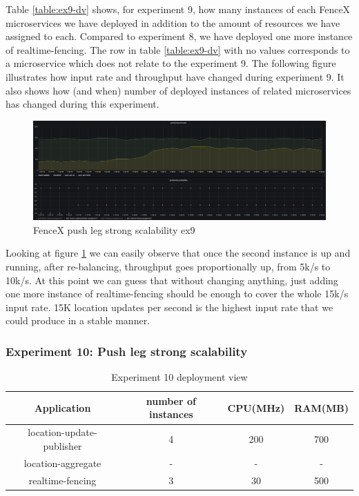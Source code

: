 \documentclass[a4]{report}
\begin{document}
    Table \ref{table:ex9-dv} shows, for experiment 9, how many instances of each FenceX microservices we have
    deployed in addition to the amount of resources we have assigned to each.
    Compared to experiment 8, we have deployed one more instance of realtime-fencing.
    The row in table \ref{table:ex9-dv} with no values corresponds to a microservice which does not relate to the
    experiment 9.
    The following figure illustrates how input rate and throughput have changed during experiment 9.
    It also shows how (and when) number of deployed instances of related microservices has changed during this
    experiment.

    \begin{figure}
        \caption{FenceX push leg strong scalability ex9}
        \label{fig:ex9}
        \includegraphics[scale=0.5]{images/evaluation/ex9-benchmarking-ongoing-2per4sec.png}
    \end{figure}

    \clearpage

    Looking at figure \ref{fig:ex9} we can easily observe that once the second instance is up and running, after
    re-balancing, throughput goes proportionally up, from 5k/s to 10k/s.
    At this point we can guess that without changing anything, just adding one more instance of realtime-fencing
    should be enough to cover the whole 15k/s input rate.
    15K location updates per second is the highest input rate that we could produce in a stable manner.

    \subsubsection{Experiment 10: Push leg strong scalability}
    \begin{table}[h!]
        \centering
        \begin{tabular}{|c|c|c|c|}
            \hline
            Application               & number of instances & CPU(MHz) & RAM(MB) \\
            \hline
            location-update-publisher & 4                   & 200      & 700     \\
            location-aggregate        & -                   & -        & -       \\
            realtime-fencing          & 3                   & 30       & 500     \\
            \hline
        \end{tabular}
        \caption{Experiment 10 deployment view}
        \label{table:ex10-dv}
    \end{table}
\end{document}
